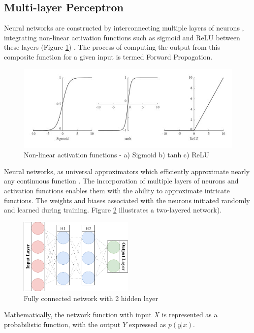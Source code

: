 \documentclass[12pt,twoside,a4paper,parskip]{scrbook} %
\begin{document}
\subsection{Multi-layer Perceptron}
Neural networks are constructed by interconnecting multiple layers of neurons \cite{mlp}, integrating non-linear activation functions such as sigmoid and ReLU between these layers (Figure \ref{fig:activation}) \cite{activation}. The process of computing the output from this composite function for a given input is termed Forward Propagation.
\begin{figure}[h]
    \centering
    \includegraphics[width=1\textwidth]{Images/activation.png}
    \caption{Non-linear activation functions - a) Sigmoid b) tanh c) ReLU}
    \label{fig:activation}
  \end{figure}
Neural networks, as universal approximators which efficiently approximate nearly any continuous function \cite{uat}. The incorporation of multiple layers of neurons and activation functions enables them with the ability to approximate intricate functions. The weights and biases associated with the neurons initiated randomly and learned during training. Figure \ref{fig:mlp} illustrates a two-layered network).
\begin{figure}[h]
    \centering
    \includegraphics[width=0.5\textwidth]{Images/mlp.png}
    \caption{Fully connected network with 2 hidden layer}
    \label{fig:mlp}
  \end{figure}
Mathematically, the network function with input \(X\) is represented as a probabilistic function, with the output \(Y\) expressed as \(p(y|x)\).
\end{document}
